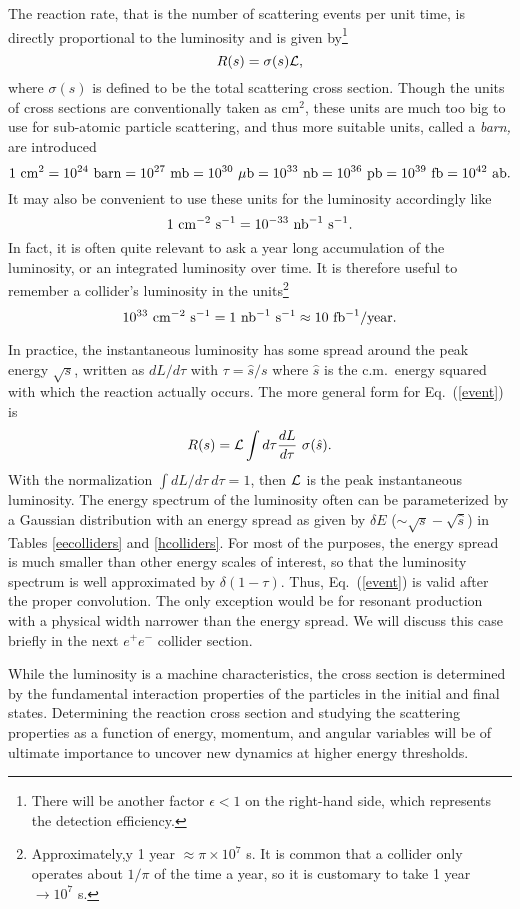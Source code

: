 \documentclass[prd,aps,floats,preprintnumbers,preprint,superscriptaddress,floatfix,nofootinbib]{revtex4}
\def\epem{e^+e^-}
\def\nbi{{\rm nb}^{-1}}
\def\fbi{{\rm fb}^{-1}}
\def\be{\begin{equation}}
\def\ee{\end{equation}}
\begin{document}
The reaction rate, that is the number of scattering events per unit time,
is  directly proportional to the luminosity and is  given by\footnote{There 
will be another factor $\epsilon<1$ on the right-hand side, 
which represents the detection efficiency.}
\be
\label{event}
R(s) = \sigma(s) \cal{L},
\ee
where $\sigma(s)$ is defined to be the total scattering cross section.
Though the units of cross sections are conventionally  taken as cm$^2$,  
these units are much too big to use for sub-atomic particle scattering, 
and thus more suitable units, called a {\it barn,} are introduced   
$$
1\ {\rm cm}^2=10^{24}\ {\rm barn}=10^{27}\ {\rm mb} = 10^{30}\ \mu{\rm b}=
10^{33}\ {\rm nb}=10^{36}\ {\rm pb}=10^{39}\ {\rm fb}=10^{42}\ {\rm ab.}
$$
It may also be convenient to use these units for the luminosity accordingly
like 
$$ 1\ {\rm cm}^{-2}\ {\rm s}^{-1} =  10^{-33}\ \nbi\ {\rm s}^{-1}.  $$ 
In fact, it is often quite relevant to ask a year long accumulation of the
luminosity, or an integrated luminosity over time. 
It is therefore useful to remember a collider's luminosity
in the units\footnote{Approximately,y
1 year $\approx \pi\times 10^7$ s. It is common that a collider only
operates about $1/\pi$ of the time a year, so it is customary 
to take 1 year $\to 10^7$ s.}
$$10^{33}\ {\rm cm}^{-2}\ {\rm s}^{-1}=1\  \nbi\ {\rm s}^{-1}\approx10\ 
\fbi/{\rm year.}$$

In practice, the instantaneous  luminosity  has some spread around the 
peak energy $\sqrt s$, written as $dL/d\tau$ with $\tau=\hat s/s$ where
$\hat s$ is the c.m.~energy squared with which the reaction actually occurs. 
The more general form for Eq.~(\ref{event}) is
\be
\label{events}
R(s) =  {\cal L} \int d\tau {dL\over d\tau}\ \sigma(\hat s).
\label{lum}
\ee
 With the normalization $\int dL/d\tau\ d\tau=1$, then ${\cal L}$ is the
 peak instantaneous luminosity. The energy spectrum of the luminosity often
can be parameterized by a Gaussian distribution with an energy spread
as given by $\delta E$ ($\sim \sqrt s- \sqrt{\hat s}$) in Tables \ref{eecolliders} and \ref{hcolliders}.
For most of the purposes, the energy spread is much smaller than other energy
scales of interest, so that the luminosity spectrum is well approximated
by  $\delta(1-\tau)$. Thus, Eq.~(\ref{event}) is valid after the proper 
convolution. The only exception would be for  resonant production with a physical
width narrower than the energy spread.  
We will discuss this case briefly  in the next $\epem$ collider section. 

While the luminosity is a machine characteristics, 
the cross section is determined by the fundamental interaction 
properties of the particles in the initial and final states.  Determining the
reaction cross section and studying the scattering properties as a function
of energy, momentum, and angular variables will be of ultimate importance
to uncover new dynamics at higher energy thresholds.
\end{document}
